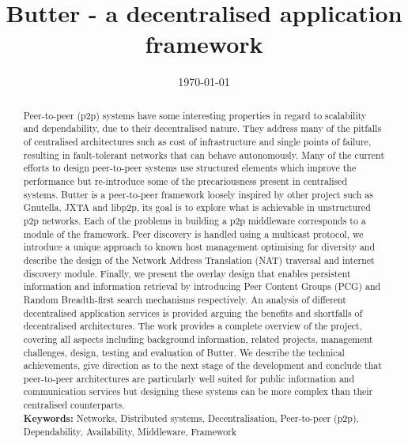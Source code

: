 \documentclass[a4paper]{report}
\title{Butter - a decentralised application framework}
\date{\today}
\begin{document}
    \maketitle

    \begin{abstract}
        Peer-to-peer (p2p) systems have some interesting properties in regard to scalability and dependability, due to their decentralised nature. They address many of the pitfalls of centralised architectures such as cost of infrastructure and single points of failure, resulting in fault-tolerant networks that can behave autonomously. Many of the current efforts to design peer-to-peer systems use structured elements which improve the performance but re-introduce some of the precariousness present in centralised systems. Butter is a peer-to-peer framework loosely inspired by other project such as Gnutella, JXTA and libp2p, its goal is to explore what is achievable in unstructured p2p networks. Each of the problems in building a p2p middleware corresponds to a module of the framework. Peer discovery is handled using a multicast protocol, we introduce a unique approach to known host management optimising for diversity and describe the design of the Network Address Translation (NAT) traversal and internet discovery module. Finally, we present the overlay design that enables persistent information and information retrieval by introducing Peer Content Groups (PCG) and Random Breadth-first search mechanisms respectively. An analysis of different decentralised application services is provided arguing the benefits and shortfalls of decentralised architectures. The work provides a complete overview of the project, covering all aspects including background information, related projects, management challenges, design, testing and evaluation of Butter. We describe the technical achievements, give direction as to the next stage of the development and conclude that peer-to-peer architectures are particularly well suited for public information and communication services but designing these systems can be more complex than their centralised counterparts.\\

        \noindent\textbf{Keywords:} Networks, Distributed systems, Decentralisation, Peer-to-peer (p2p), Dependability, Availability, Middleware, Framework
    \end{abstract}

    \tableofcontents

    
    
    
    
    
    
    
    
    
    
    

    
    

    \appendix

    
    
    
    
\end{document}
